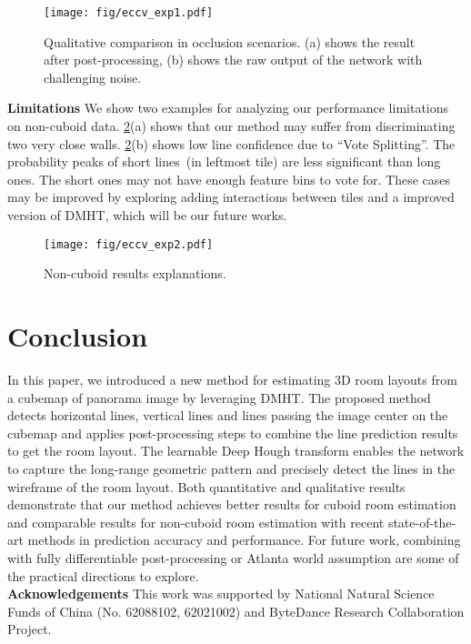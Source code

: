 \documentclass[runningheads]{llncs}
\begin{document}
\begin{figure}[!b]
	\centering
	\texttt{[image: fig/eccv\_exp1.pdf]}
	\caption{Qualitative comparison in occlusion scenarios. (a) shows the result after post-processing, (b) shows the raw output of the network with challenging noise.}
	\label{fig:fig_occlusion} 
\end{figure}

\noindent\textbf{Limitations}
We show two examples for analyzing our performance limitations on non-cuboid data.
\cref{fig:fig_limit}(a) shows that our method may suffer from discriminating two very close walls.
\cref{fig:fig_limit}(b) shows low line confidence due to ``Vote Splitting''. The probability peaks of short lines~(in leftmost tile) are less significant than long ones. The short ones may not have enough feature bins to vote for.
These cases may be improved by exploring adding interactions between tiles and a improved version of DMHT, which will be our future works.


\begin{figure}[!h]
	\centering
	\texttt{[image: fig/eccv\_exp2.pdf]}
	\caption{Non-cuboid results explanations.}
	\label{fig:fig_limit} 
\end{figure} \section{Conclusion}
In this paper, we introduced a new method for estimating 3D room layouts from a cubemap of panorama image by leveraging DMHT. The proposed method detects horizontal lines, vertical lines and lines passing the image center on the cubemap and applies post-processing steps to combine the line prediction results to get the room layout. The learnable Deep Hough transform enables the network to capture the long-range geometric pattern and precisely detect the lines in the wireframe of the room layout. Both quantitative and qualitative results demonstrate that our method achieves better results for cuboid room estimation and comparable results for non-cuboid room estimation with recent state-of-the-art methods in prediction accuracy and performance.
For future work, combining with fully differentiable post-processing or Atlanta world assumption are some of the practical directions to explore. 
 \ \\\noindent\textbf{Acknowledgements}
This work was supported by  National Natural Science Funds of China (No. 62088102, 62021002) and ByteDance Research Collaboration Project.
\ULforem
\end{document}
